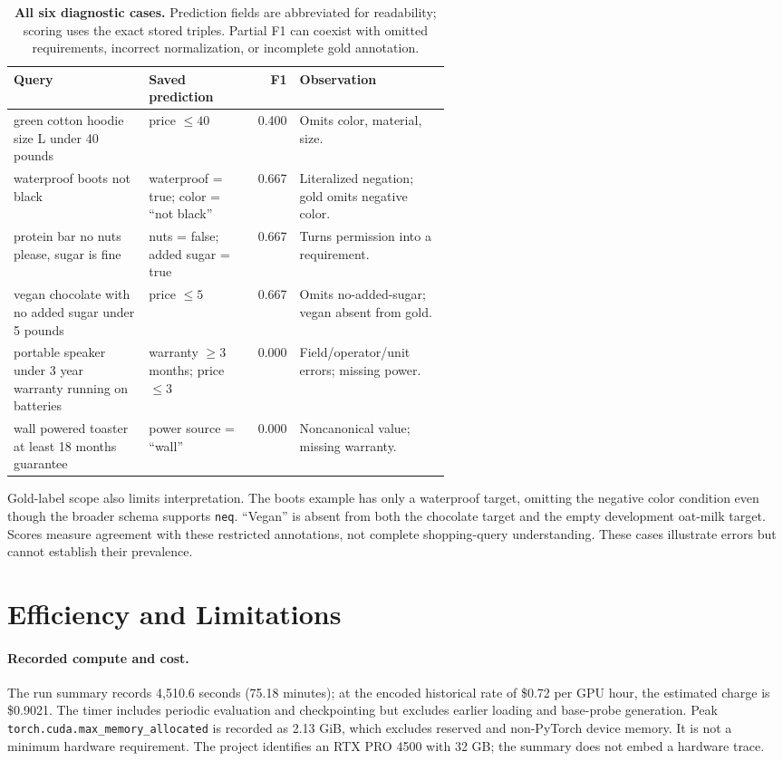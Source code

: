 \documentclass{article}
\newcommand{\code}[1]{\texttt{#1}}
\begin{document}
\begin{table}[t]
\centering\small
\caption{\textbf{All six diagnostic cases.} Prediction fields are abbreviated for readability; scoring uses the exact stored triples. Partial F1 can coexist with omitted requirements, incorrect normalization, or incomplete gold annotation.}
\label{tab:errors}
\renewcommand{\arraystretch}{1.12}
\begin{tabularx}{\linewidth}{@{}>{\raggedright\arraybackslash}p{0.31\linewidth}>{\raggedright\arraybackslash}p{0.25\linewidth}r>{\raggedright\arraybackslash}X@{}}
\toprule
Query & Saved prediction & F1 & Observation \\
\midrule
 green cotton hoodie size L under 40 pounds & price $\leq40$ & 0.400 & Omits color, material, size. \\
 waterproof boots not black & waterproof = true; color = ``not black'' & 0.667 & Literalized negation; gold omits negative color. \\
 protein bar no nuts please, sugar is fine & nuts = false; added sugar = true & 0.667 & Turns permission into a requirement. \\
 vegan chocolate with no added sugar under 5 pounds & price $\leq5$ & 0.667 & Omits no-added-sugar; vegan absent from gold. \\
 portable speaker under 3 year warranty running on batteries & warranty $\geq3$ months; price $\leq3$ & 0.000 & Field/operator/unit errors; missing power. \\
 wall powered toaster at least 18 months guarantee & power source = ``wall'' & 0.000 & Noncanonical value; missing warranty. \\
\bottomrule
\end{tabularx}
\end{table}

Gold-label scope also limits interpretation. The boots example has only a waterproof target, omitting the negative color condition even though the broader schema supports \code{neq}. ``Vegan'' is absent from both the chocolate target and the empty development oat-milk target. Scores measure agreement with these restricted annotations, not complete shopping-query understanding. These cases illustrate errors but cannot establish their prevalence.

\section{Efficiency and Limitations}
\label{sec:limits}
\paragraph{Recorded compute and cost.}
The run summary records 4,510.6 seconds (75.18 minutes); at the encoded historical rate of \$0.72 per GPU hour, the estimated charge is \$0.9021. The timer includes periodic evaluation and checkpointing but excludes earlier loading and base-probe generation. Peak \code{torch.cuda.max\_memory\_allocated} is recorded as 2.13 GiB, which excludes reserved and non-PyTorch device memory. It is not a minimum hardware requirement. The project identifies an RTX PRO 4500 with 32 GB; the summary does not embed a hardware trace.
\end{document}
